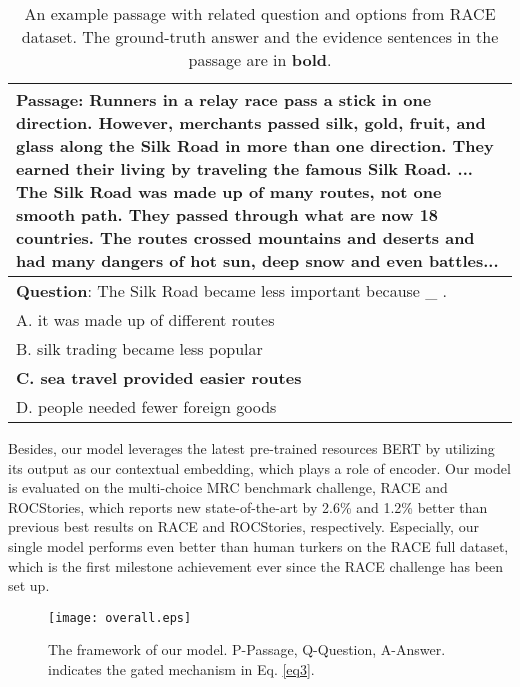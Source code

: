 \documentclass[11pt,a4paper]{article}
\begin{document}
	\begin{table}[t!]
		\begin{center}
\begin{tabular}{|p{6.9cm}|}
\hline
\textbf{Passage}: Runners in a relay race pass a stick in one direction. However, merchants passed silk, gold, fruit, and glass along the Silk Road in more than one direction. They earned their living by traveling the famous Silk Road. ... \textbf{The Silk Road was made up of many routes, not one smooth path.} They passed through what are now 18 countries. The routes crossed mountains and deserts and had many dangers of hot sun, deep snow and even battles... \\ 
				\hline
\textbf{Question}: The Silk Road became less important because \_ .\\    
				\quad A. it was made up of different routes\\  
				\quad B. silk trading became less popular\\
				\quad \textbf{C. sea travel provided easier routes}  \\ 
				\quad D. people needed fewer foreign goods \\
				\hline
\end{tabular}
		\end{center}
		\caption{\label{table1} An example passage with related question and options from RACE dataset. The ground-truth answer and the evidence sentences in the passage are in \textbf{bold}.}
	\end{table}
	
	Besides, our model leverages the latest pre-trained resources BERT \cite{Devlin-18} by utilizing its output as our contextual embedding, which plays a role of encoder. Our model is evaluated on the multi-choice MRC benchmark challenge, RACE and ROCStories, which reports new state-of-the-art by 2.6\% and 1.2\% better than previous best results on RACE and ROCStories, respectively. Especially, our single model performs even better than human turkers on the RACE full dataset, which is the first milestone achievement ever since the RACE challenge has been set up.
	
	\begin{figure*}[t!]
		\centering
		\texttt{[image: overall.eps]}
		
		\caption{The framework of our model. P-Passage, Q-Question, A-Answer.  indicates the gated mechanism in Eq. \ref{eq3}.}
		\label{figure1}
	\end{figure*}
	
\end{document}

